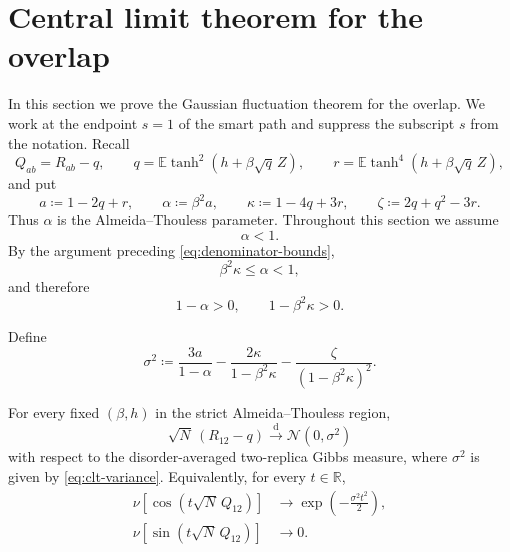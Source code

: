 
\section{Central limit theorem for the overlap}
\label{sec:overlap-clt}

In this section we prove the Gaussian fluctuation theorem for the overlap.
We work at the endpoint $s=1$ of the smart path and suppress the subscript
$s$ from the notation.  Recall
\[
 Q_{ab}=R_{ab}-q,
 \qquad
 q=\mathbb E\tanh^2(h+\beta\sqrt q\,Z),
 \qquad
 r=\mathbb E\tanh^4(h+\beta\sqrt q\,Z),
\]
and put
\[
 a\coloneqq 1-2q+r,
 \qquad
 \alpha\coloneqq \beta^2a,
 \qquad
 \kappa\coloneqq1-4q+3r,
 \qquad
 \zeta\coloneqq2q+q^2-3r.
\]
Thus $\alpha$ is the Almeida--Thouless parameter.  Throughout this section
we assume
\[
 \alpha<1.
\]
By the argument preceding \eqref{eq:denominator-bounds},
\[
 \beta^2\kappa\le\alpha<1,
\]
and therefore
\begin{equation}
 1-\alpha>0,
 \qquad
 1-\beta^2\kappa>0.
 \label{eq:clt-positive-denominators}
\end{equation}

Define
\begin{equation}
 \sigma^2
 \coloneqq
 \frac{3a}{1-\alpha}
 -\frac{2\kappa}{1-\beta^2\kappa}
 -\frac{\zeta}{(1-\beta^2\kappa)^2}.
 \label{eq:clt-variance}
\end{equation}

\begin{theorem}
\label{thm:overlap-clt}
For every fixed $(\beta,h)$ in the strict Almeida--Thouless region,
\[
 \sqrt N\,(R_{12}-q)
 \xrightarrow{\mathrm d}
 \mathcal N(0,\sigma^2)
\]
with respect to the disorder-averaged two-replica Gibbs measure, where
$\sigma^2$ is given by \eqref{eq:clt-variance}.  Equivalently, for every
$t\in\mathbb R$,
\begin{align}
 \nu\!\left[
 \cos\!\left(t\sqrt N\,Q_{12}\right)
 \right]
 &\longrightarrow
 \exp\!\left(-\frac{\sigma^2t^2}{2}\right),
 \label{eq:clt-cos-limit}\\
 \nu\!\left[
 \sin\!\left(t\sqrt N\,Q_{12}\right)
 \right]
 &\longrightarrow 0.
 \label{eq:clt-sin-limit}
\end{align}
\end{theorem}

